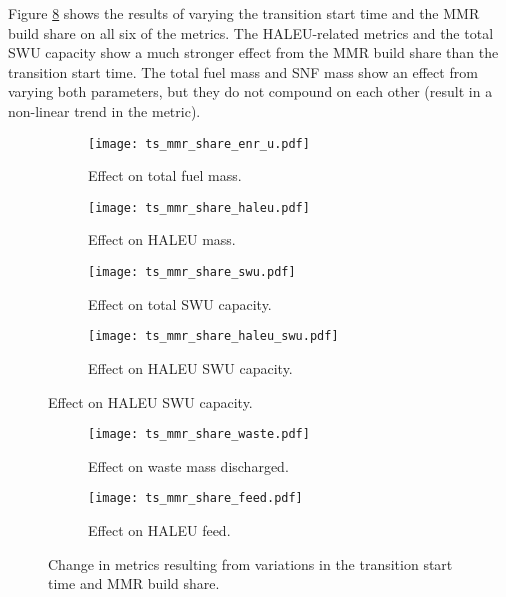 Figure \ref{fig:ts_mmr_share} shows the results of varying the 
transition start time and the \gls{MMR} build share on all 
six of the metrics. The \gls{HALEU}-related metrics and the total 
\gls{SWU} capacity show a much stronger effect from the \gls{MMR} 
build share than the transition start time. The total fuel mass 
and \gls{SNF} mass show an effect from varying both parameters, 
but they do not compound on each other (result in a non-linear 
trend in the metric). 

\begin{figure}
    \begin{subfigure}[t]{0.48\textwidth}
        \centering
        \texttt{[image: ts\_mmr\_share\_enr\_u.pdf]}
        \caption{Effect on total fuel mass.}
        \label{fig:ts_mmr_share_enr_u}
    \end{subfigure}
    \hfill
    \begin{subfigure}[t]{0.48\textwidth}
        \centering
        \texttt{[image: ts\_mmr\_share\_haleu.pdf]}
        \caption{Effect on HALEU mass.}
        \label{fig:ts_mmr_share_haleu}
    \end{subfigure}
    
    \begin{subfigure}[t]{0.48\textwidth}
        \centering
        \texttt{[image: ts\_mmr\_share\_swu.pdf]}
        \caption{Effect on total SWU capacity.}
        \label{fig:ts_mmr_share_swu}
    \end{subfigure}
    \hfill
    \begin{subfigure}[t]{0.48\textwidth}
        \centering
        \texttt{[image: ts\_mmr\_share\_haleu\_swu.pdf]}
        \caption{Effect on HALEU SWU capacity.}
        \label{fig:ts_mmr_share_haleu_swu}
    \end{subfigure}
\end{figure}

\begin{figure}
    \ContinuedFloat
    \begin{subfigure}[t]{0.48\textwidth}
        \centering
        \texttt{[image: ts\_mmr\_share\_waste.pdf]}
        \caption{Effect on waste mass discharged.}
        \label{fig:ts_mmr_share_waste}
    \end{subfigure}
    \hfill
    \begin{subfigure}[t]{0.48\textwidth}
        \centering
        \texttt{[image: ts\_mmr\_share\_feed.pdf]}
        \caption{Effect on HALEU feed.}
        \label{fig:ts_mmr_share_feed}
    \end{subfigure}
    \caption{Change in metrics resulting from variations in the 
    transition start time and MMR build share.}
    \label{fig:ts_mmr_share}
\end{figure}


